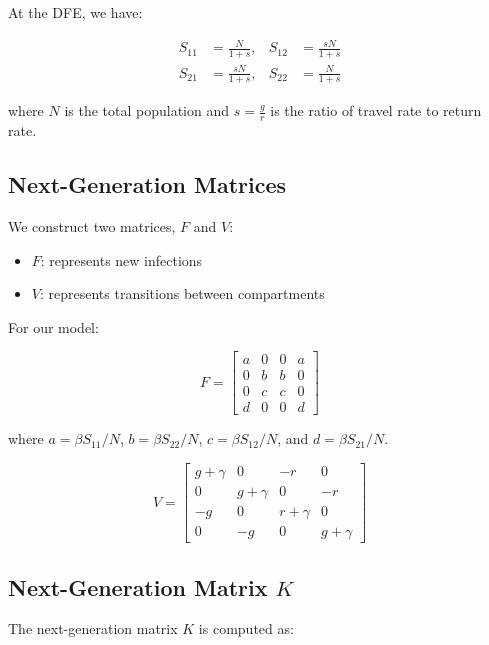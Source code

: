 \documentclass[11pt]{article}
\begin{document}
At the DFE, we have:

\begin{align*}
S_{11} &= \frac{N}{1 + s}, & S_{12} &= \frac{sN}{1 + s} \\
S_{21} &= \frac{sN}{1 + s}, & S_{22} &= \frac{N}{1 + s}
\end{align*}

where $N$ is the total population and $s = \frac{g}{r}$ is the ratio of travel rate to return rate.

\subsection{Next-Generation Matrices}

We construct two matrices, $F$ and $V$:

\begin{itemize}
    \item $F$: represents new infections
    \item $V$: represents transitions between compartments
\end{itemize}

For our model:

\begin{equation*}
F = \begin{bmatrix}
a & 0 & 0 & a \\
0 & b & b & 0 \\
0 & c & c & 0 \\
d & 0 & 0 & d
\end{bmatrix}
\end{equation*}

where $a = \beta S_{11}/N$, $b = \beta S_{22}/N$, $c = \beta S_{12}/N$, and $d = \beta S_{21}/N$.

\begin{equation*}
V = \begin{bmatrix}
g + \gamma & 0 & -r & 0 \\
0 & g + \gamma & 0 & -r \\
-g & 0 & r + \gamma & 0 \\
0 & -g & 0 & g + \gamma
\end{bmatrix}
\end{equation*}

\subsection{Next-Generation Matrix $K$}

The next-generation matrix $K$ is computed as:
\end{document}
